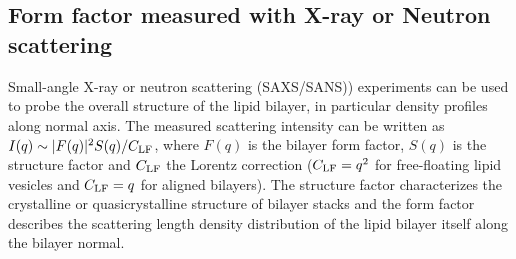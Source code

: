 \documentclass[aps,prl,superscriptaddress,twocolumn]{revtex4}
\begin{document}

\subsection{Form factor measured with X-ray or Neutron scattering}

Small-angle X-ray or neutron scattering (SAXS/SANS)) experiments can be used to
probe the overall structure of the lipid bilayer, in particular density profiles along normal axis.
The measured scattering intensity can be written as 
$I(q)\sim|F(q)|^2S(q) / C_{{\rm LF}}$, where $F(q)$ is the bilayer form 
factor, $S(q)$ is the structure factor and $C_{{\rm LF}}$ the Lorentz correction ($C_{{\rm LF}} = q^2$ 
for free-floating lipid vesicles and $C_{{\rm LF}}=q$ for aligned bilayers). 
The structure factor characterizes the crystalline or quasicrystalline structure of bilayer 
stacks and the form factor describes the scattering length density distribution of the lipid bilayer 
itself along the bilayer normal. 
\end{document}
